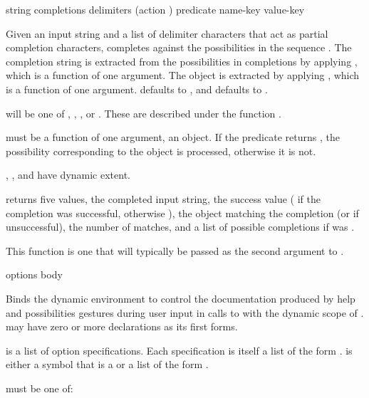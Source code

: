  {string completions delimiters
                                      \key (action ) predicate
                                           name-key value-key}


Given an input string  and a list of delimiter characters
 that act as partial completion characters,
 completes against the possibilities in the
sequence .  The completion string is extracted from the
possibilities in completions by applying , which is a function of
one argument.  The object is extracted by applying , which is a
function of one argument.   defaults to , and
 defaults to .

 will be one of , ,
, or .  These are described under the
function .

 must be a function of one argument, an object.  If the predicate
returns , the possibility corresponding to the object is processed,
otherwise it is not.

, , and  have dynamic extent.

 returns five values, the completed input
string, the success value ( if the completion was successful,
otherwise ), the object matching the completion (or  if
unsuccessful), the number of matches, and a list of possible completions if
 was .

This function is one that will typically be passed as the second argument to
.


 {options \body body}

Binds the dynamic environment to control the documentation produced by help and
possibilities gestures during user input in calls to  with the
dynamic scope of .   may have zero or more declarations as
its first forms.

 is a list of option specifications.  Each specification is itself
a list of the form .   is either
a symbol that is a  or a list of the form .

 must be one of:

